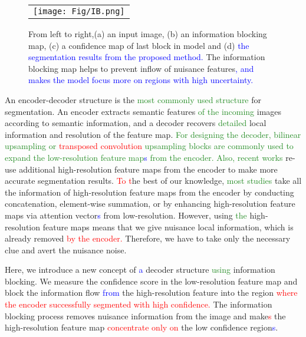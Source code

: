 \documentclass[10pt,twocolumn,letterpaper]{article}
\newcommand\Lars[1]{\textcolor{blue}{#1}}
\newcommand\yj[1]{\textcolor{ForestGreen}{#1}}
\newcommand\nj[1]{\textcolor{red}{#1}}
\newcommand\Lars[1]{#1}
\newcommand\yj[1]{#1}
\newcommand\nj[1]{#1}
\begin{document}
\begin{figure}[t]
\begin{center}

\begin{tabular}{c}
    \texttt{[image: Fig/IB.png]}\\

        \end{tabular}\end{center}
\vspace{-4mm}
   \caption{From left to right,(a) an input image, (b) an information blocking map, (c) a confidence map of last block in model and (d) \Lars{the segmentation results from the proposed method.}
   The information blocking map helps to prevent inflow of nuisance features\Lars{, and makes the model focus more on regions with high uncertainty.}}\label{fig:confmap}
\end{figure}
An encoder-decoder structure is the \yj{most commonly used structure} for segmentation.
An encoder extracts semantic features \yj{of the incoming}  images according to semantic information, and a decoder recovers \yj{detailed} local information and resolution of the feature map. \yj{For designing the decoder, bilinear upsampling or \nj{transposed convolution} upsampling blocks are commonly used to expand the low-resolution feature map\Lars{s} from the encoder.}
\yj{Also, recent works \cite{mehta2018espnet, park2018concentrated, howard2019searching, deeplabv3plus2018}} re-use additional high-resolution feature maps from the encoder to make more accurate segmentation results.
\nj{To t}he best of our knowledge, \yj{most studies} take all the information of high-resolution feature maps from the encoder by conducting concatenation, element-wise summation, or by enhancing high-resolution feature maps via attention vector\Lars{s} from low-resolution.
However, using \yj{the} high-resolution feature maps means that we give nuisance local information, which is already removed \nj{by the encoder.} Therefore, we have to take only the necessary clue and avert the nuisance noise.

Here, we introduce a new concept of \Lars{a} decoder structure \yj{using} information blocking.
We measure the confidence score in the low-resolution feature map and block the information flow \Lars{from} the high-resolution feature into the region \nj{where the encoder successfully segmented with high confidence.} The information blocking process removes nuisance information from the image and make\nj{s} the high-resolution feature map \nj{concentrate only on} the low confidence region\Lars{s}.
\end{document}
